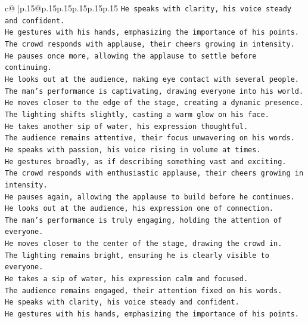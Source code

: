 \documentclass{article}
\begin{document}
{\begin{supertabular}{c@{$\;$}|p{.15\linewidth}@{}p{.15\linewidth}p{.15\linewidth}p{.15\linewidth}p{.15\linewidth}p{.15\linewidth}}
{{{\texttt{He speaks with clarity, his voice steady and confident.  } \\
\texttt{He gestures with his hands, emphasizing the importance of his points.  } \\
\texttt{The crowd responds with applause, their cheers growing in intensity.  } \\
\texttt{He pauses once more, allowing the applause to settle before continuing.  } \\
\texttt{He looks out at the audience, making eye contact with several people.  } \\
\texttt{The man's performance is captivating, drawing everyone into his world.  } \\
\texttt{He moves closer to the edge of the stage, creating a dynamic presence.  } \\
\texttt{The lighting shifts slightly, casting a warm glow on his face.  } \\
\texttt{He takes another sip of water, his expression thoughtful.  } \\
\texttt{The audience remains attentive, their focus unwavering on his words.  } \\
\texttt{He speaks with passion, his voice rising in volume at times.  } \\
\texttt{He gestures broadly, as if describing something vast and exciting.  } \\
\texttt{The crowd responds with enthusiastic applause, their cheers growing in intensity.  } \\
\texttt{He pauses again, allowing the applause to build before he continues.  } \\
\texttt{He looks out at the audience, his expression one of connection.  } \\
\texttt{The man's performance is truly engaging, holding the attention of everyone.  } \\
\texttt{He moves closer to the center of the stage, drawing the crowd in.  } \\
\texttt{The lighting remains bright, ensuring he is clearly visible to everyone.  } \\
\texttt{He takes a sip of water, his expression calm and focused.  } \\
\texttt{The audience remains engaged, their attention fixed on his words.  } \\
\texttt{He speaks with clarity, his voice steady and confident.  } \\
\texttt{He gestures with his hands, emphasizing the importance of his points.  } \\
}}}
\end{supertabular}}
\end{document}
